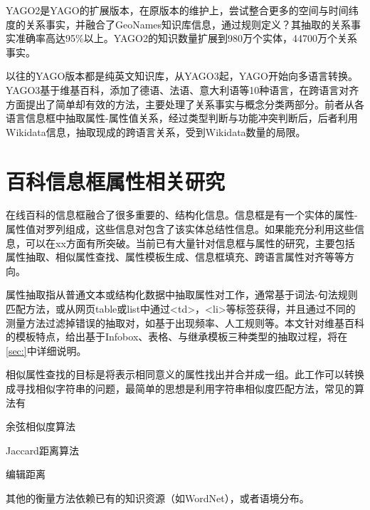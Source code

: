 {\heiti YAGO2}是YAGO的扩展版本，在原版本的维护上，尝试整合更多的空间与时间纬度的关系事实，并融合了GeoNames知识库信息，通过规则定义？其抽取的关系事实准确率高达95\%以上。YAGO2的知识数量扩展到980万个实体，44700万个关系事实。

以往的YAGO版本都是纯英文知识库，从YAGO3起，YAGO开始向多语言转换。YAGO3基于维基百科，添加了德语、法语、意大利语等10种语言，在跨语言对齐方面提出了简单却有效的方法，主要处理了关系事实与概念分类两部分。前者从各语言信息框中抽取属性-属性值关系，经过类型判断与功能冲突判断后，后者利用Wikidata信息，抽取现成的跨语言关系，受到Wikidata数量的局限。




\section{百科信息框属性相关研究}
\label{sec:property-research}
在线百科的信息框融合了很多重要的、结构化信息。信息框是有一个实体的属性-属性值对罗列组成，这些信息对包含了该实体总结性信息。如果能充分利用这些信息，可以在xx方面有所突破。当前已有大量针对信息框与属性的研究，主要包括属性抽取\cite{}、相似属性查找、属性模板生成、信息框填充、跨语言属性对齐等等方向。

{\heiti 属性抽取}指从普通文本或结构化数据中抽取属性对工作，通常基于词法-句法规则匹配方法\cite{pacsca2007role,lee2013attribute}，或从网页table或list中通过<td>，<li>等标签获得\cite{crestan2010web}，并且通过不同的测量方法过滤掉错误的抽取对，如基于出现频率\cite{pacsca2007role}、人工规则\cite{lee2013attribute}等。本文针对维基百科的模板特点，给出基于Infobox、表格、与继承模板三种类型的抽取过程，将在\ref{sec:}中详细说明。

{\heiti 相似属性查找}的目标是将表示相同意义的属性找出并合并成一组。此工作可以转换成寻找相似字符串的问题，最简单的思想是利用字符串相似度匹配方法，常见的算法有

余弦相似度算法

Jaccard距离算法

编辑距离

其他的衡量方法依赖已有的知识资源（如WordNet）\cite{yang2005measuring}，或者语境分布\cite{pantel2009web}。

